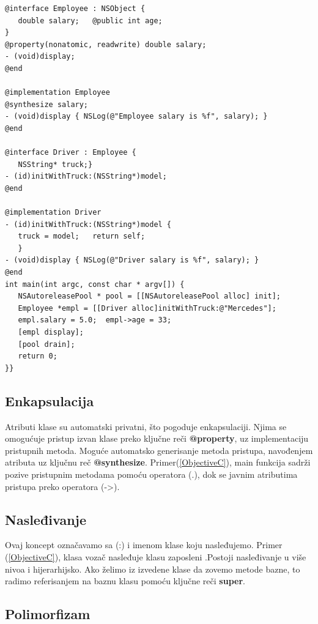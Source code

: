 \documentclass[a4paper]{article}
\begin{document}
\begin{lstlisting}[caption={Primer koda u Objective C jeziku},frame=single, label=ObjectiveC]
@interface Employee : NSObject {
   double salary;	@public int age;
}
@property(nonatomic, readwrite) double salary; 
- (void)display;
@end

@implementation Employee
@synthesize salary; 
- (void)display { NSLog(@"Employee salary is %f", salary); }
@end

@interface Driver : Employee {
   NSString* truck;}
- (id)initWithTruck:(NSString*)model;
@end

@implementation Driver
- (id)initWithTruck:(NSString*)model {
   truck = model;	return self;
   }
- (void)display { NSLog(@"Driver salary is %f", salary); }
@end
int main(int argc, const char * argv[]) {
   NSAutoreleasePool * pool = [[NSAutoreleasePool alloc] init];
   Employee *empl = [[Driver alloc]initWithTruck:@"Mercedes"];
   empl.salary = 5.0;  empl->age = 33;
   [empl display];
   [pool drain];
   return 0;
}}
\end{lstlisting}

\subsection{Enkapsulacija}
\label{subsec:ObjCEnkapsulacija}

Atributi klase su automatski privatni, što pogoduje enkapsulaciji. Njima se omogućuje pristup izvan klase preko ključne reči \textbf{@property}, uz implementaciju pristupnih metoda. Moguće automatsko generisanje metoda pristupa, navođenjem atributa uz ključnu reč \textbf{@synthesize}. Primer(\ref{ObjectiveC}), main funkcija sadrži pozive pristupnim metodama pomoću operatora (.), dok se javnim atributima pristupa preko operatora (->).

\subsection{Nasleđivanje}
\label{subsec:ObjCNasledjivanje}

Ovaj koncept označavamo sa (:) i imenom klase koju nasleđujemo. Primer (\ref{ObjectiveC}), klasa vozač nasleđuje klasu zaposleni .Postoji nasleđivanje u više nivoa i hijerarhijsko. Ako želimo iz izvedene klase da zovemo metode bazne, to radimo referisanjem na baznu klasu pomoću ključne reči \textbf{super}.

\subsection{Polimorfizam}
\label{subsec:ObjCPolimorfizam}
\end{document}
